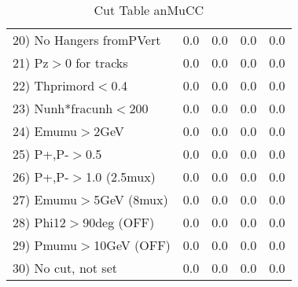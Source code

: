 \begin{table}[h!]
\begin{tabular}{||l||r|r|r|r||}
 20) No Hangers fromPVert &         0.0 &         0.0 &         0.0 &         0.0 \\
 21) Pz$>$0 for tracks    &         0.0 &         0.0 &         0.0 &         0.0 \\
 22) Thprimord$<$0.4      &         0.0 &         0.0 &         0.0 &         0.0 \\
 23) Nunh*fracunh$<$200   &         0.0 &         0.0 &         0.0 &         0.0 \\
 24) Emumu$>$2GeV         &         0.0 &         0.0 &         0.0 &         0.0 \\
 25) P+,P-$>$0.5          &         0.0 &         0.0 &         0.0 &         0.0 \\
 26) P+,P-$>$1.0 (2.5mux) &         0.0 &         0.0 &         0.0 &         0.0 \\
 27) Emumu$>$5GeV  (8mux) &         0.0 &         0.0 &         0.0 &         0.0 \\
 28) Phi12$>$90deg  (OFF) &         0.0 &         0.0 &         0.0 &         0.0 \\
 29) Pmumu$>$10GeV  (OFF) &         0.0 &         0.0 &         0.0 &         0.0 \\
 30) No cut, not set      &         0.0 &         0.0 &         0.0 &         0.0 \\
 \hline
 \hline
 \end{tabular}
 \caption{Cut Table  anMuCC }
 \label{tab-cut_anmcc}
 \end{table}
